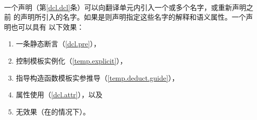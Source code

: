 \paragraph{} %
一个声明（第\ref{dcl.dcl}条）可以向翻译单元内引入一个或多个名字，或重新声明之前
的声明所引入的名字。如果是则声明指定这些名字的解释和语义属性。一个声明也可以具有
以下效果：
\begin{enumerate}
  \item 一条静态断言（\ref{dcl.pre}），
  \item 控制模板实例化（\ref{temp.explicit}），
  \item 指导构造函数模板实参推导（\ref{temp.deduct.guide}），
  \item 属性使用（\ref{dcl.attr}），以及
  \item 无效果（在的情况下）。
\end{enumerate}

